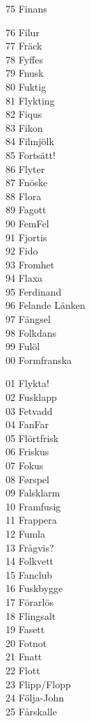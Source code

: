 \documentclass[a6paper, 10pt, twoside]{article}
\begin{document}
\begin{lyrics}
\begin{minipage}[t]{0.3\textwidth}
75 Finans
\physicalonly{\\}\end{minipage}\begin{minipage}[t]{0.3\textwidth}\small
76 Filur\\
77 Fräck\\
78 Fyffes\\
79 Fnusk\\
80 Fuktig\\
81 Flykting\\
82 Fiqus\\
83 Fikon\\
84 Filmjölk\\
85 Fortsätt!\\
86 Flyter\\
87 Fnöske\\
88 Flora\\
89 Fagott\\
90 FemFel\\
91 Fjortis\\
92 Fido\\
93 Fromhet\\
94 Flaxa\\
95 Ferdinand\\
96 Felande\physicalonly{\\} Länken\\
97 Fängsel \\
98 Folkdans \\
99 Fulöl\\
00 Formfranska
\physicalonly{\\}\end{minipage}\begin{minipage}[t]{0.3\textwidth}\small
01 Flykta!\\
02 Fusklapp\\
03 Fetvadd\\
04 FanFar\\
05 Flörtfrisk\\
06 Friskus\\
07 Fokus\\
08 Førspel\\
09 Falsklarm\\
10 Framfusig\\
11 Frappera\\
12 Fumla\\
13 Frågvis?\\
14 Folkvett\\
15 Fanclub\\
16 Fuskbygge\\
17 Förarlös\\
18 Flingsalt\\
19 Fasett\\
20 Fotnot\\
21 Fnatt \\
22 Flott \\
23 Flipp/Flopp \\
24 Följa-John \\
25 Fårskalle
\end{minipage}
\end{lyrics}
\end{document}
